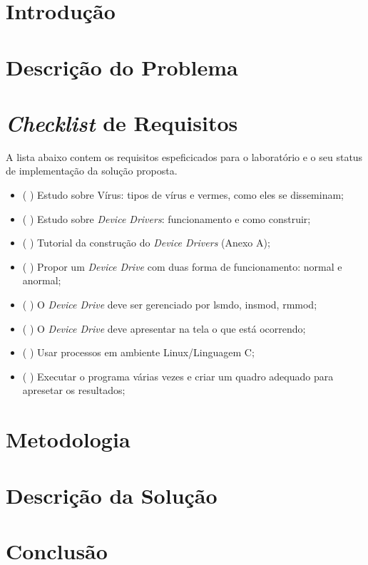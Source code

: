 \section{Introdução}

\section{Descrição do Problema}

\section{\textit{Checklist} de Requisitos}

A lista abaixo contem os requisitos espeficicados para o laboratório e o
seu status de implementação da solução proposta.

\begin{itemize}
  \item (  ) Estudo sobre Vírus: tipos de vírus e vermes, como eles se disseminam;
  \item (  ) Estudo sobre \textit{Device Drivers}: funcionamento e como construir;
  \item (  ) Tutorial da construção do \textit{Device Drivers} (Anexo A);
  \item (  ) Propor um \textit{Device Drive} com duas forma de funcionamento: normal e anormal;
  \item (  ) O \textit{Device Drive} deve ser gerenciado por lsmdo, insmod, rmmod;
  \item (  ) O \textit{Device Drive} deve apresentar na tela o que está ocorrendo;
  \item (  ) Usar processos em ambiente Linux/Linguagem C;
  \item (  ) Executar o programa várias vezes e criar um quadro adequado para apresetar os resultados;
\end{itemize}

\section{Metodologia}

\section{Descrição da Solução}

\section{Conclusão}



